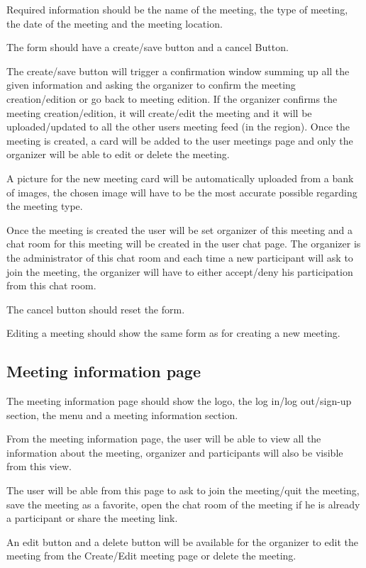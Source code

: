 \documentclass[conference]{IEEEtran}
\begin{document}
Required information should be the name of the meeting, the type of meeting, the date of the meeting and the meeting location.

The form should have a create/save button and a cancel Button. 

The create/save button will trigger a confirmation window summing up all the given information and asking the organizer to confirm the meeting creation/edition or go back to meeting edition. 
If the organizer confirms the meeting creation/edition, it will create/edit the meeting and it will be uploaded/updated to all the other users meeting feed (in the region). 
Once the meeting is created, a card will be added to the user meetings page and only the organizer will be able to edit or delete the meeting.

A picture for the new meeting card will be automatically uploaded from a bank of images, the chosen image will have to be the most accurate possible regarding the meeting type.

Once the meeting is created the user will be set organizer of this meeting and a chat room for this meeting will be created in the user chat page. 
The organizer is the administrator of this chat room and each time a new participant will ask to join the meeting, the organizer will have to either accept/deny his participation from this chat room.

The cancel button should reset the form.

Editing a meeting should show the same form as for creating a new meeting.

\subsection{Meeting information page}

The meeting information page should show the logo, the log in/log out/sign-up section, the menu and a meeting information section.

From the meeting information page, the user will be able to view all the information about the meeting, organizer and participants will also be visible from this view.

The user will be able from this page to ask to join the meeting/quit the meeting, save the meeting as a favorite, open the chat room of the meeting if he is already a participant or share the meeting link.

An edit button and a delete button will be available for the organizer to edit the meeting from the Create/Edit meeting page or delete the meeting.
\end{document}
